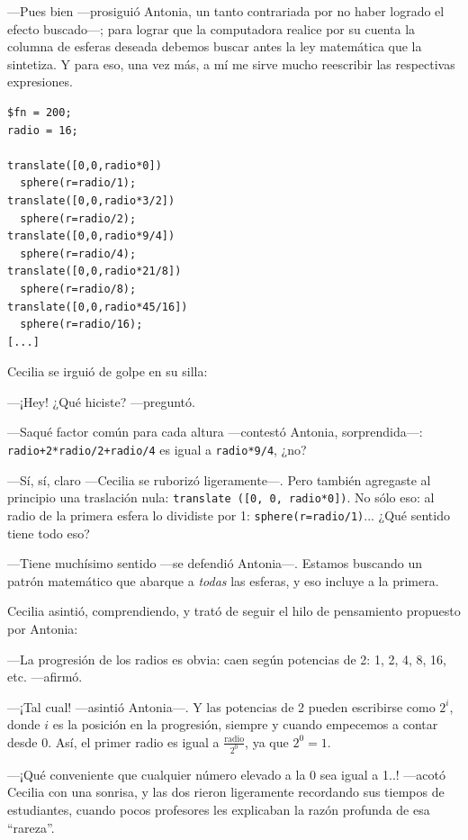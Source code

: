 ---Pues bien ---prosiguió Antonia, un tanto contrariada por no haber
logrado el efecto buscado---; para lograr que la computadora realice
por su cuenta la columna de esferas deseada debemos buscar antes la
ley matemática que la sintetiza. Y para eso, una vez más, a mí me
sirve mucho reescribir las respectivas expresiones.


    \begin{lstlisting}
$fn = 200;
radio = 16;

translate([0,0,radio*0])
  sphere(r=radio/1);
translate([0,0,radio*3/2])
  sphere(r=radio/2);
translate([0,0,radio*9/4])
  sphere(r=radio/4);
translate([0,0,radio*21/8])
  sphere(r=radio/8);
translate([0,0,radio*45/16])
  sphere(r=radio/16);
[...]
\end{lstlisting}%



Cecilia se irguió de golpe en su silla:

---¡Hey! ¿Qué hiciste? ---preguntó.

---Saqué factor común para cada altura ---contestó Antonia,
sorprendida---: \lstinline!radio+2*radio/2+radio/4! es igual a
\lstinline!radio*9/4!, ¿no?

---Sí, sí, claro ---Cecilia se ruborizó ligeramente---.  Pero también
agregaste al principio una traslación nula:
\lstinline!translate ([0, 0, radio*0])!. No sólo eso: al radio de la
primera esfera lo dividiste por 1:
\lstinline!sphere(r=radio/1)!... ¿Qué sentido tiene todo eso?

---Tiene muchísimo sentido ---se defendió Antonia---.  Estamos
buscando un patrón matemático que abarque a \emph{todas} las esferas,
y eso incluye a la primera.

 Cecilia asintió, comprendiendo, y trató de seguir el hilo de
 pensamiento propuesto por Antonia:

 ---La progresión de los radios es obvia: caen según potencias de 2:
 1, 2, 4, 8, 16, etc. ---afirmó.

 ---¡Tal cual! ---asintió Antonia---. Y las potencias de 2 pueden
 escribirse como $2^i$, donde $i$ es la posición en la progresión,
 siempre y cuando empecemos a contar desde 0. Así, el primer radio es
 igual a $\frac{\text{radio}}{2^0}$, ya que $2^0=1$.

---¡Qué conveniente que cualquier número elevado a la 0 sea
   igual a 1..! ---acotó Cecilia con una sonrisa, y las dos rieron
 ligeramente recordando sus tiempos de estudiantes, cuando pocos
 profesores les explicaban la razón profunda de esa ``rareza''.

